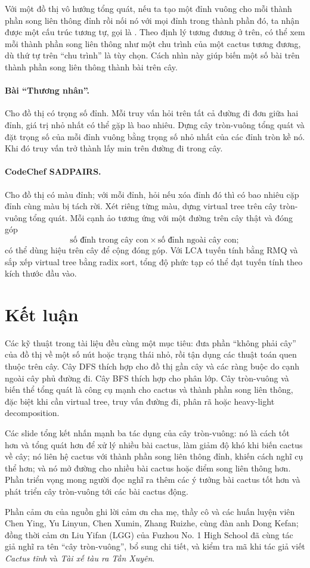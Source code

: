 \documentclass[11pt]{article}
\begin{document}
Với một đồ thị vô hướng tổng quát, nếu ta tạo một đỉnh vuông cho mỗi thành
phần song liên thông đỉnh rồi nối nó với mọi đỉnh trong thành phần đó, ta nhận
được một cấu trúc tương tự, gọi là . Theo định
lý tương đương ở trên, có thể xem mỗi thành phần song liên thông như một chu
trình của một cactus tương đương, dù thứ tự trên ``chu trình'' là tùy chọn.
Cách nhìn này giúp biến một số bài trên thành phần song liên thông thành bài
trên cây.

\paragraph{Bài ``Thương nhân''.}
Cho đồ thị có trọng số đỉnh. Mỗi truy vấn hỏi trên tất cả đường đi đơn giữa
hai đỉnh, giá trị nhỏ nhất có thể gặp là bao nhiêu. Dựng cây tròn-vuông tổng
quát và đặt trọng số của mỗi đỉnh vuông bằng trọng số nhỏ nhất của các đỉnh
tròn kề nó. Khi đó truy vấn trở thành lấy min trên đường đi trong cây.

\paragraph{CodeChef SADPAIRS.}
Cho đồ thị có màu đỉnh; với mỗi đỉnh, hỏi nếu xóa đỉnh đó thì có bao nhiêu cặp
đỉnh cùng màu bị tách rời. Xét riêng từng màu, dựng virtual tree trên cây
tròn-vuông tổng quát. Mỗi cạnh ảo tương ứng với một đường trên cây thật và
đóng góp
\[
  \text{số đỉnh trong cây con}\times \text{số đỉnh ngoài cây con};
\]
có thể dùng hiệu trên cây để cộng đóng góp. Với LCA tuyến tính bằng RMQ và sắp
xếp virtual tree bằng radix sort, tổng độ phức tạp có thể đạt tuyến tính theo
kích thước đầu vào.

\section*{Kết luận}

Các kỹ thuật trong tài liệu đều cùng một mục tiêu: đưa phần ``không phải cây''
của đồ thị về một số nút hoặc trạng thái nhỏ, rồi tận dụng các thuật toán quen
thuộc trên cây. Cây DFS thích hợp cho đồ thị gần cây và các ràng buộc do cạnh
ngoài cây phủ đường đi. Cây BFS thích hợp cho phân lớp. Cây tròn-vuông và biến
thể tổng quát là công cụ mạnh cho cactus và thành phần song liên thông, đặc
biệt khi cần virtual tree, truy vấn đường đi, phân rã hoặc heavy-light
decomposition.

Các slide tổng kết nhấn mạnh ba tác dụng của cây tròn-vuông: nó là cách tốt
hơn và tổng quát hơn để xử lý nhiều bài cactus, làm giảm độ khó khi biến cactus
về cây; nó liên hệ cactus với thành phần song liên thông đỉnh, khiến cách nghĩ
cụ thể hơn; và nó mở đường cho nhiều bài cactus hoặc điểm song liên thông hơn.
Phần triển vọng mong người đọc nghĩ ra thêm các ý tưởng bài cactus tốt hơn và
phát triển cây tròn-vuông tới các bài cactus động.

Phần cảm ơn của nguồn ghi lời cảm ơn cha mẹ, thầy cô và các huấn luyện viên
Chen Ying, Yu Linyun, Chen Xumin, Zhang Ruizhe, cùng đàn anh Dong Kefan; đồng
thời cảm ơn Liu Yifan (LGG) của Fuzhou No. 1 High School đã cùng tác giả nghĩ
ra tên ``cây tròn-vuông'', bổ sung chi tiết, và kiểm tra mã khi tác giả viết
\emph{Cactus tĩnh} và \emph{Tài xế tàu ra Tần Xuyên}.
\end{document}
